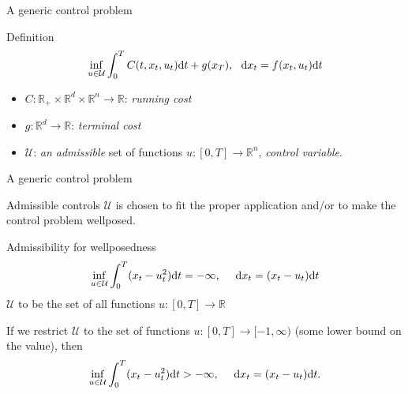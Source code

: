 \documentclass[color=usenames,dvipsnames]{beamer}
\newcommand{\dt}{\text{\normalfont d}t}
\newcommand{\dx}{\text{\normalfont d}x}
\begin{document}
\begin{frame}{A generic control problem}
    \begin{block}{Definition}
        \begin{equation}
    \label{prob:deterministic_control}
    \inf_{u\in\mathcal{U}}\int_0^TC(t,x_t,u_t){{\dt}}+g(x_T),~~{\dx}_t=f(x_t,u_t){{\dt}}
\end{equation}
\begin{itemize}[label=$\bullet$]
    \item $C:\mathbb{R}_+\times\mathbb{R}^d\times\mathbb{R}^n\to \mathbb{R}$: \emph{running cost}
    \item $g:\mathbb{R}^d\to\mathbb{R}$: \emph{terminal cost}
    \item $\mathcal{U}$: \emph{an admissible} set of functions $u:[0,T]\to\mathbb{R}^n$, \emph{control variable}.
\end{itemize} 
    \end{block}
\end{frame}
\begin{frame}{A generic control problem}
    \begin{block}{Admissible controls}
        $\mathcal{U}$ is chosen to fit the proper application and/or to make the control problem wellposed.
    \end{block}
    \begin{exampleblock}{Admissibility for wellposedness}
         \begin{equation}
        \inf_{u\in\mathcal{U}} \int_0^T(x_t-u_t^2) {{\dt}}=-\infty,~~~~{\dx}_t=(x_t-u_t){{\dt}}
    \end{equation}
$\mathcal{U}$ to be the set of all functions $u:[0,T]\to\mathbb{R}$ 

If we restrict  $\mathcal{U}$ to the set of functions $u:[0,T]\to[-1,\infty)$ (some lower bound on the value), then 
    \begin{equation}
        \inf_{u\in\mathcal{U}} \int_0^T(x_t-u_t^2) {{\dt}}>-\infty,~~~~{\dx}_t=(x_t-u_t){{\dt}}.
    \end{equation}
    \end{exampleblock}
\end{frame}
\end{document}
